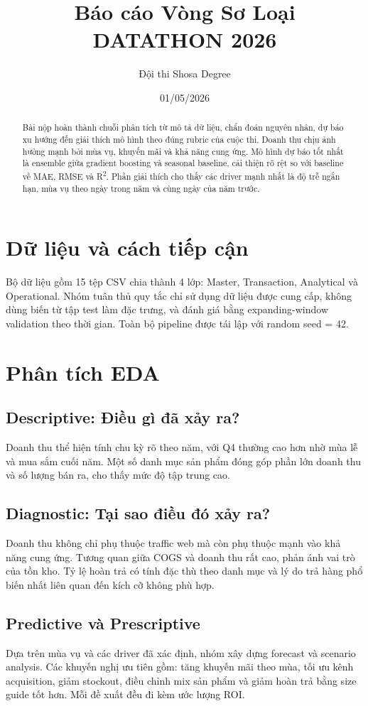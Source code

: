 \documentclass[10pt]{article}
\title{Báo cáo Vòng Sơ Loại DATATHON 2026}
\author{Đội thi Shosa Degree}
\date{01/05/2026}
\begin{document}
\maketitle

\begin{abstract}
Bài nộp hoàn thành chuỗi phân tích từ mô tả dữ liệu, chẩn đoán nguyên nhân, dự báo xu hướng đến giải thích mô hình theo đúng rubric của cuộc thi. Doanh thu chịu ảnh hưởng mạnh bởi mùa vụ, khuyến mãi và khả năng cung ứng. Mô hình dự báo tốt nhất là ensemble giữa gradient boosting và seasonal baseline, cải thiện rõ rệt so với baseline về MAE, RMSE và R\textsuperscript{2}. Phần giải thích cho thấy các driver mạnh nhất là độ trễ ngắn hạn, mùa vụ theo ngày trong năm và cùng ngày của năm trước.
\end{abstract}

\section{Dữ liệu và cách tiếp cận}
Bộ dữ liệu gồm 15 tệp CSV chia thành 4 lớp: Master, Transaction, Analytical và Operational. Nhóm tuân thủ quy tắc chỉ sử dụng dữ liệu được cung cấp, không dùng biến từ tập test làm đặc trưng, và đánh giá bằng expanding-window validation theo thời gian. Toàn bộ pipeline được tái lập với random seed = 42.

\section{Phân tích EDA}
\subsection{Descriptive: Điều gì đã xảy ra?}
Doanh thu thể hiện tính chu kỳ rõ theo năm, với Q4 thường cao hơn nhờ mùa lễ và mua sắm cuối năm. Một số danh mục sản phẩm đóng góp phần lớn doanh thu và số lượng bán ra, cho thấy mức độ tập trung cao.

\subsection{Diagnostic: Tại sao điều đó xảy ra?}
Doanh thu không chỉ phụ thuộc traffic web mà còn phụ thuộc mạnh vào khả năng cung ứng. Tương quan giữa COGS và doanh thu rất cao, phản ánh vai trò của tồn kho. Tỷ lệ hoàn trả có tính đặc thù theo danh mục và lý do trả hàng phổ biến nhất liên quan đến kích cỡ không phù hợp.

\subsection{Predictive và Prescriptive}
Dựa trên mùa vụ và các driver đã xác định, nhóm xây dựng forecast và scenario analysis. Các khuyến nghị ưu tiên gồm: tăng khuyến mãi theo mùa, tối ưu kênh acquisition, giảm stockout, điều chỉnh mix sản phẩm và giảm hoàn trả bằng size guide tốt hơn. Mỗi đề xuất đều đi kèm ước lượng ROI.
\end{document}
